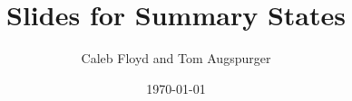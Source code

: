 \documentclass{beamer}
\title{Slides for Summary States}
\author{Caleb Floyd and Tom Augspurger}
\date{\today}
\begin{document}
\frame{\titlepage}

\section[Outline]{}
\frame{\tableofcontents}
\end{document}
